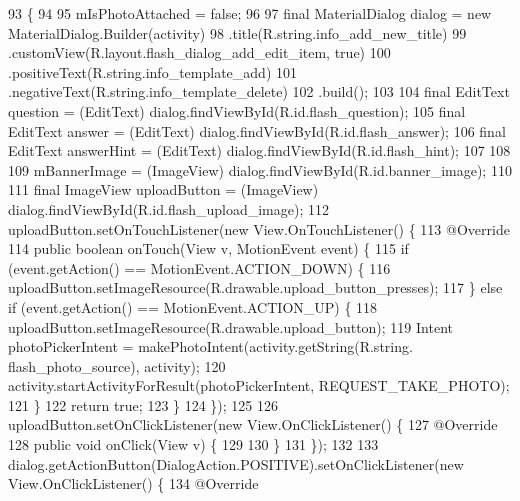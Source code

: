 \begin{DoxyCode}
93                                                  \{
94 
95         mIsPhotoAttached = \textcolor{keyword}{false};
96 
97         \textcolor{keyword}{final} MaterialDialog dialog = \textcolor{keyword}{new} MaterialDialog.Builder(activity)
98                 .title(R.string.info\_add\_new\_title)
99                 .customView(R.layout.flash\_dialog\_add\_edit\_item, \textcolor{keyword}{true})
100                 .positiveText(R.string.info\_template\_add)
101                 .negativeText(R.string.info\_template\_delete)
102                 .build();
103 
104         \textcolor{keyword}{final} EditText question = (EditText) dialog.findViewById(R.id.flash\_question);
105         \textcolor{keyword}{final} EditText answer = (EditText) dialog.findViewById(R.id.flash\_answer);
106         \textcolor{keyword}{final} EditText answerHint = (EditText) dialog.findViewById(R.id.flash\_hint);
107 
108 
109         mBannerImage = (ImageView) dialog.findViewById(R.id.banner\_image);
110 
111         \textcolor{keyword}{final} ImageView uploadButton = (ImageView) dialog.findViewById(R.id.flash\_upload\_image);
112         uploadButton.setOnTouchListener(\textcolor{keyword}{new} View.OnTouchListener() \{
113             @Override
114             \textcolor{keyword}{public} \textcolor{keywordtype}{boolean} onTouch(View v, MotionEvent event) \{
115                 \textcolor{keywordflow}{if} (event.getAction() == MotionEvent.ACTION\_DOWN) \{
116                     uploadButton.setImageResource(R.drawable.upload\_button\_presses);
117                 \} \textcolor{keywordflow}{else} \textcolor{keywordflow}{if} (event.getAction() == MotionEvent.ACTION\_UP) \{
118                     uploadButton.setImageResource(R.drawable.upload\_button);
119                     Intent photoPickerIntent = makePhotoIntent(activity.getString(R.string.
      flash\_photo\_source), activity);
120                     activity.startActivityForResult(photoPickerIntent, REQUEST\_TAKE\_PHOTO);
121                 \}
122                 \textcolor{keywordflow}{return} \textcolor{keyword}{true};
123             \}
124         \});
125 
126         uploadButton.setOnClickListener(\textcolor{keyword}{new} View.OnClickListener() \{
127             @Override
128             \textcolor{keyword}{public} \textcolor{keywordtype}{void} onClick(View v) \{
129 
130             \}
131         \});
132 
133         dialog.getActionButton(DialogAction.POSITIVE).setOnClickListener(\textcolor{keyword}{new} View.OnClickListener() \{
134             @Override

\end{DoxyCode}

